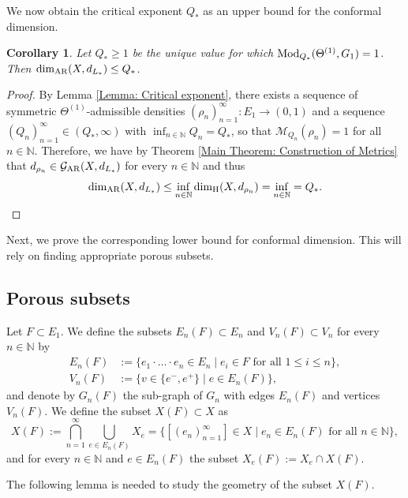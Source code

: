 \documentclass{amsart}
\newcommand{\Mod}{{\rm Mod}}
\newcommand{\AR}{{\rm AR}}
\newtheorem{corollary}[equation]{Corollary}
\numberwithin{equation}{section}
\theoremstyle{definition}
\theoremstyle{remark}
\newcommand{\N}{\mathbb{N}}
\newcommand{\cG}{\mathcal{G}}
\newcommand{\cM}{\mathcal{M}}
\begin{document}
We now obtain the critical exponent \(Q_*\) as an upper bound for the conformal dimension.

\begin{corollary}\label{Corollary: Confdim upper bound}
    Let \(Q_*\geq1\) be the unique value for which \(\Mod_{Q_*}(\Theta^{(1)},G_1)=1\). Then \(\dim_\AR(X,d_{L_*})\leq Q_*\).
\end{corollary}
\begin{proof}
    By Lemma \ref{Lemma: Critical exponent}, there exists a sequence of symmetric \(\Theta^{(1)}\)-admissible densities \((\rho_n)_{n=1}^\infty\colon E_1\to (0,1)\) and a sequence \((Q_n)_{n=1}^\infty\in (Q_*,\infty)\) with \(\inf_{n\in\N}Q_n=Q_*\), so that \(\cM_{Q_n}(\rho_n)=1\) for all \(n\in\N\). Therefore, we have by Theorem \ref{Main Theorem: Construction of Metrics} that \(d_{\rho_n}\in\cG_\AR(X,d_{L_*})\) for every \(n\in\N\) and thus
        \begin{equation}\label{Equation: Confdim upper bound}
            \dim_\AR(X,d_{L_*})\leq\inf_{n\in\N}\dim_{\mathrm{H}}(X,d_{\rho_n})=\inf_{n\in\N}=Q_*.
        \end{equation}
\end{proof}




Next, we prove the corresponding lower bound for conformal dimension. This will rely on finding appropriate porous subsets.

\subsection{Porous subsets} 
Let \(F\subset E_1\). We define the subsets \(E_n(F)\subset E_n\) and \(V_n(F)\subset V_n\) for every \(n\in \N\) by
        \[
        \begin{split}
            E_n(F)&:=\{e_1\cdot\ldots\cdot e_n\in E_n\mid e_i\in F\text{ for all }1\leq i\leq n\},\\
            V_n(F)&:= \{v\in \{e^-,e^+\}\mid e\in E_n(F)\},
        \end{split}
        \]
    and denote by \(G_n(F)\) the sub-graph of \(G_n\) with edges \(E_n(F)\) and vertices \(V_n(F)\). We define the subset \(X(F)\subset X\) as
        \[
            X(F):=\bigcap_{n=1}^\infty \bigcup_{e\in E_n(F)}X_e=\{[(e_n)_{n=1}^\infty]\in X\mid e_n\in E_n(F)\text{ for all }n\in\N \},
        \]
    and for every \(n\in\N\) and \(e\in E_n(F)\) the subset \(X_e(F):=X_e\cap X(F)\).



The following lemma is needed to study the geometry of the subset $X(F)$. 
\end{document}

